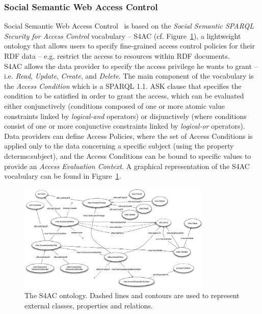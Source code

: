 \subsubsection{Social Semantic Web Access Control}
Social Semantic Web Access Control~\cite{villata2011social} is based on the \textit{Social Semantic SPARQL Security for Access Control} vocabulary -- S4AC (cf. Figure~\ref{fig:s4ac_onto}), a lightweight ontology that allows users to specify fine-grained access control policies for their RDF data -- e.g. restrict the access to resources within RDF documents.\\

S4AC allows the data provider to specify the access privilege he wants to grant -- i.e. \textit{Read}, \textit{Update}, \textit{Create}, and \textit{Delete}. The main component of the vocabulary is the \textit{Access Condition} which is a SPARQL 1.1. ASK clause that specifies the condition to be satisfied in order to grant the access, which can be evaluated either conjunctively (conditions composed of one or more atomic value constraints linked by \textit{logical-and} operators) or disjunctively (where conditions consist of one or more conjunctive constraints linked by \textit{logical-or} operators). Data providers can define Access Policies, where the set of Access Conditions is applied only to the data concerning a specific subject (using the property dcterms:subject), and the Access Conditions can be bound to specific values to provide an \textit{Access Evaluation Context}. A graphical representation of the S4AC vocabulary can be found in Figure~\ref{fig:s4ac_onto}.\\

\begin{figure}[h]
  \begin{center}
    \includegraphics[width=350px]{img/s4ac_ontology.png}
        \caption{The S4AC ontology. Dashed lines and contours are used to represent external classes, properties and relations.}
        \label{fig:s4ac_onto}
  \end{center}
\end{figure}

